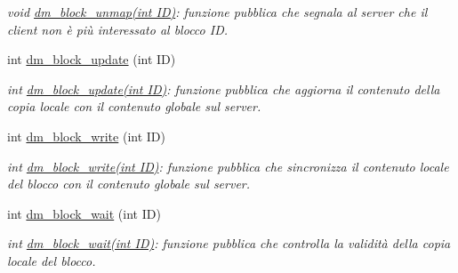 \begin{CompactItemize}
\begin{CompactList}\small\item\em void \hyperlink{classLibrary_f9cacba594b2d8ad1f01d73755ef79aa_f9cacba594b2d8ad1f01d73755ef79aa}{dm\_\-block\_\-unmap(int ID)}: funzione pubblica che segnala al server che il client non è più interessato al blocco ID. \item\end{CompactList}\item 
int \hyperlink{classLibrary_1f541c7e1158ffb4d6d0f976dba29d71_1f541c7e1158ffb4d6d0f976dba29d71}{dm\_\-block\_\-update} (int ID)
\begin{CompactList}\small\item\em int \hyperlink{classLibrary_1f541c7e1158ffb4d6d0f976dba29d71_1f541c7e1158ffb4d6d0f976dba29d71}{dm\_\-block\_\-update(int ID)}: funzione pubblica che aggiorna il contenuto della copia locale con il contenuto globale sul server. \item\end{CompactList}\item 
int \hyperlink{classLibrary_bea6b3730412c3716861261edd3bf670_bea6b3730412c3716861261edd3bf670}{dm\_\-block\_\-write} (int ID)
\begin{CompactList}\small\item\em int \hyperlink{classLibrary_bea6b3730412c3716861261edd3bf670_bea6b3730412c3716861261edd3bf670}{dm\_\-block\_\-write(int ID)}: funzione pubblica che sincronizza il contenuto locale del blocco con il contenuto globale sul server. \item\end{CompactList}\item 
int \hyperlink{classLibrary_467dc5e619aeb35ac8d5ac78b48dd450_467dc5e619aeb35ac8d5ac78b48dd450}{dm\_\-block\_\-wait} (int ID)
\begin{CompactList}\small\item\em int \hyperlink{classLibrary_467dc5e619aeb35ac8d5ac78b48dd450_467dc5e619aeb35ac8d5ac78b48dd450}{dm\_\-block\_\-wait(int ID)}: funzione pubblica che controlla la validità della copia locale del blocco. \item\end{CompactList}\end{CompactItemize}
